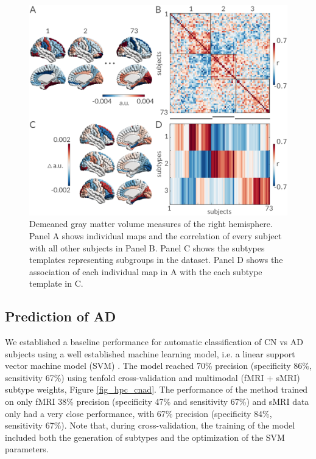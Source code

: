 \documentclass[authoryear]{elsarticle}
\begin{document}
\begin{figure}[ht]
\centering
\includegraphics[width=\linewidth]{figures/subjects_variability.png}
\caption{Demeaned gray matter volume measures of the right hemisphere. Panel A shows individual maps and the correlation of every subject with all other subjects in Panel B. Panel C shows the subtypes templates representing subgroups in the dataset. Panel D shows the association of each individual map in A with the each subtype template in C.}
\label{fig_subj_var}
\end{figure}

\subsection*{Prediction of AD}
We established a baseline performance for automatic classification of CN vs AD subjects using a well established machine learning model, i.e. a linear support vector machine model (SVM) \citep{Cortes1995}. The model reached 70\% precision (specificity 86\%, sensitivity 67\%) using tenfold cross-validation and multimodal (fMRI + sMRI) subtype weights, Figure \ref{fig_hpc_cnad}. The performance of the method trained on only fMRI 38\% precision (specificity 47\% and sensitivity 67\%) and sMRI data only had a very close performance, with 67\% precision (specificity 84\%, sensitivity 67\%). Note that, during cross-validation, the training of the model included both the generation of subtypes and the optimization of the SVM parameters.
\end{document}
